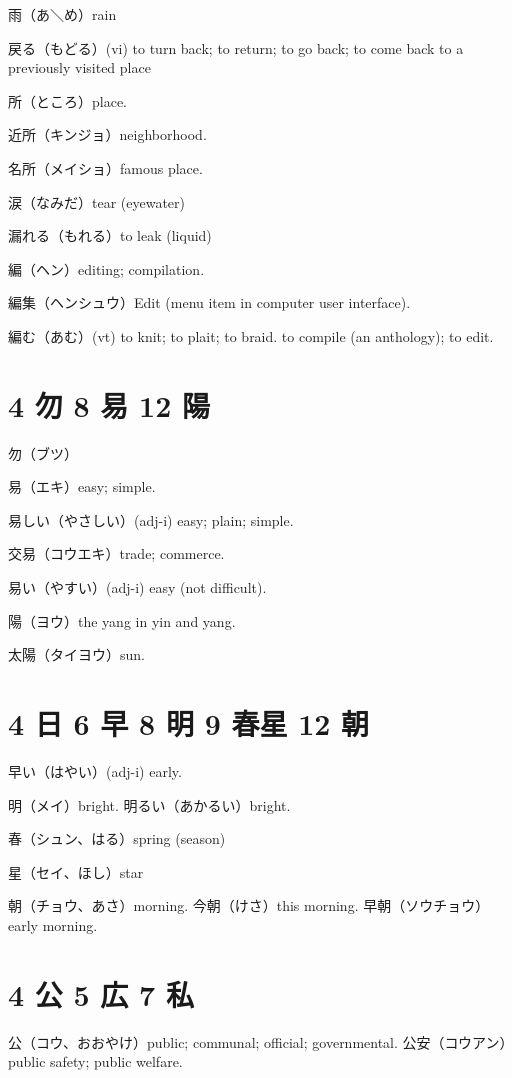 雨（あ＼め）rain

戻る（もどる）(vi) to turn back; to return; to go back;
to come back to a previously visited place

所（ところ）place.

近所（キンジョ）neighborhood.

名所（メイショ）famous place.

涙（なみだ）tear (eyewater)

漏れる（もれる）to leak (liquid)

編（ヘン）editing; compilation.

編集（ヘンシュウ）Edit (menu item in computer user interface).

編む（あむ）(vt)
to knit; to plait; to braid.
to compile (an anthology); to edit.

\section{4 勿 8 易 12 陽}

勿（ブツ）

易（エキ）easy; simple.

易しい（やさしい）(adj-i) easy; plain; simple.

交易（コウエキ）trade; commerce.

易い（やすい）(adj-i) easy (not difficult).

陽（ヨウ）the yang in yin and yang.

太陽（タイヨウ）sun.

\section{4 日 6 早 8 明 9 春星 12 朝}

早い（はやい）(adj-i) early.

明（メイ）bright.
明るい（あかるい）bright.

春（シュン、はる）spring (season)

星（セイ、ほし）star

朝（チョウ、あさ）morning.
今朝（けさ）this morning.
早朝（ソウチョウ）early morning.

\section{4 公 5 広 7 私}

公（コウ、おおやけ）public; communal; official; governmental.
公安（コウアン）public safety; public welfare.

